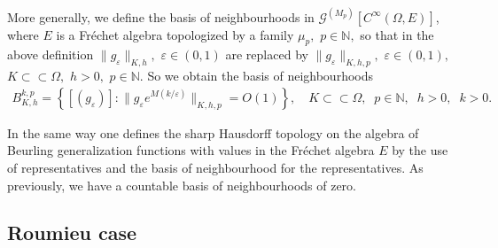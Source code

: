 \documentclass[sn-mathphys,Numbered]{sn-jnl}%
\theoremstyle{thmstyleone}%
\newtheorem{proposition}[theorem]{Proposition}%
\theoremstyle{thmstyletwo}%
\newtheorem{remark}{Remark}%
\theoremstyle{thmstylethree}%
\begin{document}
More generally, we define the basis of neighbourhoods in $\mathcal G^{(M_p)}[C^\infty(\Omega,E)]$,  where $E$ is a Fr\'echet algebra topologized by a family $\mu_p, $ $p\in \mathbb N,$  so that in the above definition $\|g_{\varepsilon}\|_{K,h},$ $\varepsilon\in (0,1)$ are replaced by $ \|g_\varepsilon\|_{K,h,p},$ $\varepsilon\in(0,1), $ $K\subset\subset \Omega ,$ $h>0, $ $ p\in \mathbb N.$ So we obtain the basis of neighbourhoods
\begin{align*}
B_{K,h}^{k,p} = \left\{[(g_{\varepsilon})]: \|g_{\varepsilon}e^{{M}({k}/{\varepsilon})}\|_{K,h,p} =O(1)\right\}, \quad K\subset\subset \Omega ,\;\; p\in \mathbb N, \;\;h>0 ,\;\;k>0. 
\end{align*}
    
In the same way one defines the sharp Hausdorff topology on the algebra of Beurling generalization functions with values in the Fr\'echet algebra $E$ by the use of representatives and the basis of neighbourhood for the representatives.
As previously, we have a countable basis of neighbourhoods of zero.  %
  


\subsection{Roumieu case}    
                              
\end{document}
